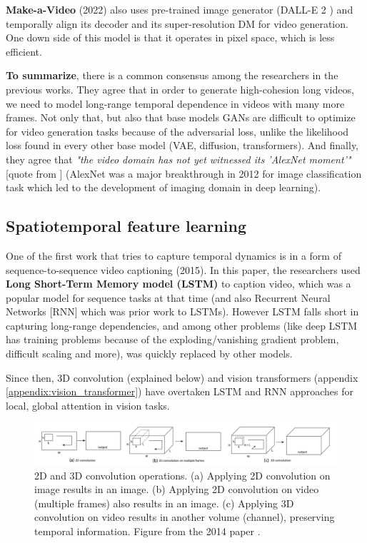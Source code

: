\textbf{Make-a-Video} (2022) \cite{make_a_video} also uses pre-trained image generator (DALL-E 2 \cite{dalle_2}) and temporally align its decoder and its super-resolution DM for video generation. One down side of this model is that it operates in pixel space, which is less efficient.

\textbf{To summarize}, there is a common consensus among the researchers in the previous works. They agree that in order to generate high-cohesion long videos, we need to model long-range temporal dependence in videos with many more frames. Not only that, but also that base models GANs are difficult to optimize for video generation tasks because of the adversarial loss, unlike the likelihood loss found in every other base model (VAE, diffusion, transformers). And finally, they agree that \textit{"the video domain has not yet witnessed its 'AlexNet moment'"} [quote from \cite{tran2018closer}] (AlexNet \cite{alexnet} was a major breakthrough in 2012 for image classification task which led to the development of imaging domain in deep learning). 






\subsection{Spatiotemporal feature learning}

One of the first work that tries to capture temporal dynamics is in a form of sequence-to-sequence video captioning \cite{venugopalan2015sequence} (2015). In this paper, the researchers used \textbf{Long Short-Term Memory model (LSTM)} to caption video, which was a popular model for sequence tasks at that time (and also Recurrent Neural Networks [RNN] which was prior work to LSTMs). However LSTM falls short in capturing long-range dependencies, and among other problems (like deep LSTM has training problems because of the exploding/vanishing gradient problem, difficult scaling and more), was quickly replaced by other models.

Since then, 3D convolution (explained below) and vision transformers (appendix \ref{appendix:vision_transformer}) have overtaken LSTM and RNN approaches for local, global attention in vision tasks.

\begin{figure}
    \centering
    \includegraphics[width=1\textwidth]{images/video_synthesis/conv.png}
    \caption{2D and 3D convolution operations. (a) Applying 2D convolution on image results in an image. (b) Applying 2D convolution on video (multiple frames) also results in an image. (c) Applying 3D convolution on video results in another volume (channel), preserving temporal information. Figure from the 2014 paper \cite{tran2015learning}.}
\end{figure}

